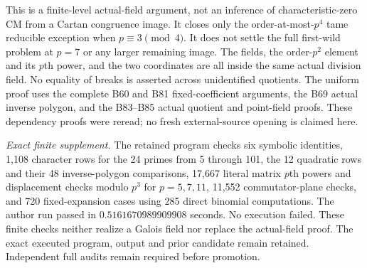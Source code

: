 \begin{remark}
\label{rem:B-RD102-scope}
This is a finite-level actual-field argument, not an
inference of characteristic-zero CM from a Cartan
congruence image. It closes only the order-at-most-$p^4$
tame reducible exception when $p\equiv3\pmod4$.
It does not settle the full first-wild problem at
$p=7$ or any larger remaining image.
The fields, the order-$p^2$ element and its
$p$th power, and the two coordinates are all inside
the same actual division field.
No equality of breaks is asserted across unidentified
quotients. The uniform proof uses the complete B60 and
B81 fixed-coefficient arguments, the B69 actual inverse
polygon, and the B83--B85 actual quotient and point-field
proofs. These dependency proofs were reread; no fresh
external-source opening is claimed here.

\smallskip
\noindent\emph{Exact finite supplement.}
The retained program
checks six symbolic identities, 1,108 character rows
for the 24 primes from 5 through 101, the 12 quadratic
rows and their 48 inverse-polygon comparisons, 17,667
literal matrix $p$th powers and displacement checks
modulo $p^3$ for $p=5,7,11$, 11,552 commutator-plane
checks, and 720 fixed-expansion cases using 285 direct
binomial computations. The author run passed in
$0.5161670989909908$ seconds. No execution failed.
These finite checks neither realize a Galois field nor
replace the actual-field proof. The exact executed
program, output and prior candidate remain retained.
Independent full audits remain required before promotion.
\end{remark}
